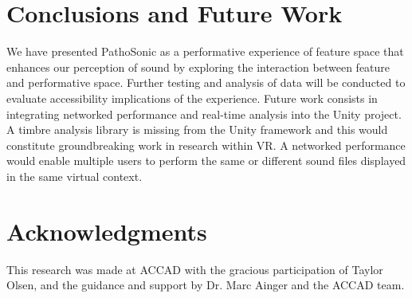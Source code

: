 \documentclass{nime-alternate}
\begin{document}
\section{Conclusions and Future Work}

We have presented PathoSonic as a performative experience of feature space that enhances our perception of sound by exploring the interaction between feature and performative space. Further testing and analysis of data will be conducted to evaluate accessibility implications of the experience. Future work consists in integrating networked performance and real-time analysis into the Unity project. A timbre analysis library is missing from the Unity framework and this would constitute groundbreaking work in research within VR. A networked performance would enable multiple users to perform the same or different sound files displayed in the same virtual context. 

\section{Acknowledgments}

This research was made at ACCAD with the gracious participation of Taylor Olsen, and the guidance and support by Dr. Marc Ainger and the ACCAD team.





 
\end{document}
